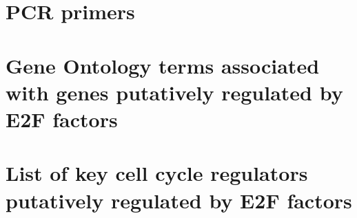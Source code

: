 \documentclass[11pt,twoside,a4paper]{report}
\begin{document}
\cleardoublepage
\begin{appendices}
	\chapter{PCR primers}
		\label{appendixQPCRprimers}

	\chapter{Gene Ontology terms associated with genes putatively regulated by E2F factors}
	
	\chapter{List of key cell cycle regulators putatively regulated by E2F factors}	
	\label{list_key_cell_cycle_regulators}

\end{appendices}
\end{document}
